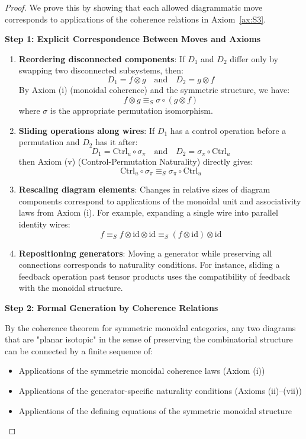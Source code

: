 \documentclass[11pt]{article}
\begin{document}
\begin{proof}
We prove this by showing that each allowed diagrammatic move corresponds to applications of the coherence relations in Axiom~\ref{ax:S3}.

\noindent\textbf{Step 1: Explicit Correspondence Between Moves and Axioms}

\begin{enumerate}
    \item \textbf{Reordering disconnected components}: If $D_1$ and $D_2$ differ only by swapping two disconnected subsystems, then:
    \[
    D_1 = f \otimes g \quad\text{and}\quad D_2 = g \otimes f
    \]
    By Axiom (i) (monoidal coherence) and the symmetric structure, we have:
    \[
    f \otimes g \equiv_S \sigma \circ (g \otimes f)
    \]
    where $\sigma$ is the appropriate permutation isomorphism.

    \item \textbf{Sliding operations along wires}: If $D_1$ has a control operation before a permutation and $D_2$ has it after:
    \[
    D_1 = \mathrm{Ctrl}_u \circ \sigma_\pi \quad\text{and}\quad D_2 = \sigma_\pi \circ \mathrm{Ctrl}_u
    \]
    then Axiom (v) (Control-Permutation Naturality) directly gives:
    \[
    \mathrm{Ctrl}_u \circ \sigma_\pi \equiv_S \sigma_\pi \circ \mathrm{Ctrl}_u
    \]

    \item \textbf{Rescaling diagram elements}: Changes in relative sizes of diagram components correspond to applications of the monoidal unit and associativity laws from Axiom (i). For example, expanding a single wire into parallel identity wires:
    \[
    f \equiv_S f \otimes \mathrm{id} \otimes \mathrm{id} \equiv_S (f \otimes \mathrm{id}) \otimes \mathrm{id}
    \]

    \item \textbf{Repositioning generators}: Moving a generator while preserving all connections corresponds to naturality conditions. For instance, sliding a feedback operation past tensor products uses the compatibility of feedback with the monoidal structure.
\end{enumerate}

\noindent\textbf{Step 2: Formal Generation by Coherence Relations}

By the coherence theorem for symmetric monoidal categories, any two diagrams that are "planar isotopic" in the sense of preserving the combinatorial structure can be connected by a finite sequence of:
\begin{itemize}
    \item Applications of the symmetric monoidal coherence laws (Axiom (i))
    \item Applications of the generator-specific naturality conditions (Axioms (ii)--(vii))
    \item Applications of the defining equations of the symmetric monoidal structure
\end{itemize}


\end{proof}
\end{document}
